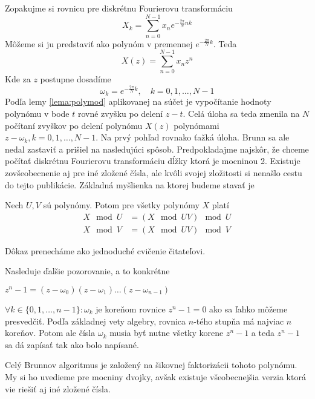 Zopakujme si rovnicu pre diskrétnu Fourierovu transformáciu
\begin{equation}
    X_k = \sum_{n=0}^{N-1} x_n e^{-\frac{2\pi}{N}nk}
\end{equation}
Môžeme si ju predstaviť ako polynóm v premennej $e^{-\frac{2\pi}{N}k}$.
Teda
\begin{equation}
    X(z) = \sum_{n=0}^{N-1} x_n z^n
\end{equation}
Kde za $z$ postupne dosadíme
\begin{equation}
    \omega_k= e^{-\frac{2\pi}{N}k}, \quad k=0,1,\dots,N-1
\end{equation}
Podľa lemy \ref{lema:polymod} aplikovanej na súčet je vypočítanie
hodnoty polynómu v bode $t$ rovné zvyšku po delení $z-t$.
Celá úloha sa teda zmenila na $N$ počítaní zvyškov po delení polynómu
$X(z)$ polynómami $z-\omega_k, k=0,1,\dots,N-1$. Na prvý pohľad
rovnako ťažká úloha. Brunn sa ale nedal zastaviť a prišiel na
nasledujúci spôsob. Predpokladajme najskôr, že chceme počítať
diskrétnu Fourierovu transformáciu dĺžky ktorá je mocninou 2.
Existuje zovšeobecnenie aj pre iné zložené čísla, ale kvôli svojej
zložitosti si nenašlo cestu do tejto publikácie.
Základná myšlienka na ktorej budeme stavať je
\begin{lema}
    Nech $U,V$ sú polynómy. Potom pre všetky polynómy $X$ platí
    \begin{align}
        X \mod U &= (X \mod UV) \mod U \\
        X \mod V &= (X \mod UV) \mod V
    \end{align}
\end{lema}
\begin{dokaz}
    Dôkaz prenecháme ako jednoduché cvičenie čitateľovi.
\end{dokaz}
Nasleduje ďalšie pozorovanie, a to konkrétne
\begin{lema}
    $z^n - 1 = (z - \omega_0)(z-\omega_1)\dots(z-\omega_{n-1})$
\end{lema}
\begin{dokaz}
    $\forall k \in \{0,1,\dots,n-1\}: \omega_k$ je koreňom rovnice
    $z^n-1=0$ ako sa ľahko môžeme presvedčiť. Podľa základnej vety
    algebry, rovnica $n$-tého stupňa má najviac $n$ koreňov. Potom
    ale čísla $\omega_k$ musia byť nutne všetky korene $z^n-1$
    a teda $z^n-1$ sa dá zapísať tak ako bolo napísané.
\end{dokaz}
Celý Brunnov algoritmus je založený na šikovnej faktorizácii tohoto
polynómu. My si ho uvedieme pre mocniny dvojky, avšak existuje
všeobecnejšia verzia ktorá vie riešiť aj iné zložené čísla.
